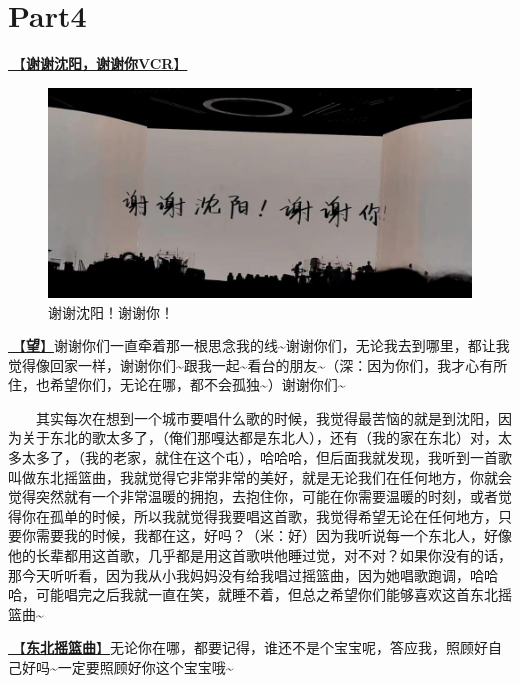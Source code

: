 \documentclass[]{ctexbook}
\begin{document}
\newpage

\section{Part4}\label{shenyang-20240907-part4}

\hyperref[thank-you-vcr]{🎥【\textbf{谢谢沈阳，谢谢你VCR}】}

\begin{figure}

{\centering \includegraphics[width=400pt]{img/shenyang20240907/thank-shenyang} 

}

\caption{谢谢沈阳！谢谢你！}\label{fig:unnamed-chunk-91}
\end{figure}

\hyperref[hope]{🎵【\textbf{望}】}谢谢你们一直牵着那一根思念我的线\textasciitilde 谢谢你们，无论我去到哪里，都让我觉得像回家一样，谢谢你们\textasciitilde 跟我一起\textasciitilde 看台的朋友\textasciitilde（深：因为你们，我才心有所住，也希望你们，无论在哪，都不会孤独\textasciitilde）谢谢你们\textasciitilde{}

  其实每次在想到一个城市要唱什么歌的时候，我觉得最苦恼的就是到沈阳，因为关于东北的歌太多了，（俺们那嘎达都是东北人），还有（我的家在东北）对，太多太多了，（我的老家，就住在这个屯），哈哈哈，但后面我就发现，我听到一首歌叫做东北摇篮曲，我就觉得它非常非常的美好，就是无论我们在任何地方，你就会觉得突然就有一个非常温暖的拥抱，去抱住你，可能在你需要温暖的时刻，或者觉得你在孤单的时候，所以我就觉得我要唱这首歌，我觉得希望无论在任何地方，只要你需要我的时候，我都在这，好吗？（米：好）因为我听说每一个东北人，好像他的长辈都用这首歌，几乎都是用这首歌哄他睡过觉，对不对？如果你没有的话，那今天听听看，因为我从小我妈妈没有给我唱过摇篮曲，因为她唱歌跑调，哈哈哈，可能唱完之后我就一直在笑，就睡不着，但总之希望你们能够喜欢这首东北摇篮曲\textasciitilde{}

\hyperref[lullaby]{🎵【\textbf{东北摇篮曲}】}无论你在哪，都要记得，谁还不是个宝宝呢，答应我，照顾好自己好吗\textasciitilde 一定要照顾好你这个宝宝哦\textasciitilde{}
\end{document}
